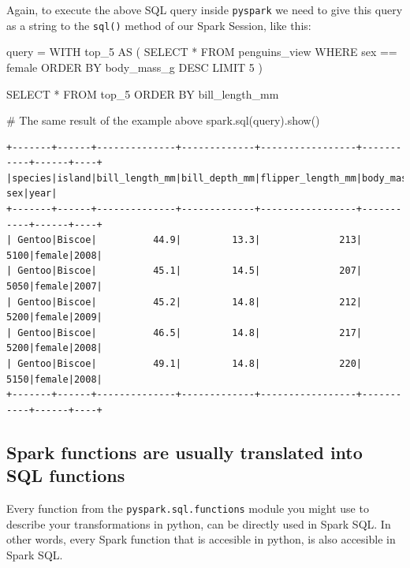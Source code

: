 \documentclass[
  11pt,
  letterpaper,
  DIV=11,
  numbers=noendperiod]{scrreprt}
\newenvironment{Shaded}{\begin{snugshade}}{\end{snugshade}}
\newcommand{\CommentTok}[1]{\textcolor[rgb]{0.37,0.37,0.37}{#1}}
\newcommand{\NormalTok}[1]{\textcolor[rgb]{0.00,0.23,0.31}{#1}}
\newcommand{\OperatorTok}[1]{\textcolor[rgb]{0.37,0.37,0.37}{#1}}
\newcommand{\StringTok}[1]{\textcolor[rgb]{0.13,0.47,0.30}{#1}}
\begin{document}
Again, to execute the above SQL query inside \texttt{pyspark} we need to
give this query as a string to the \texttt{sql()} method of our Spark
Session, like this:

\begin{Shaded}
\begin{Highlighting}[]
\NormalTok{query }\OperatorTok{=} \StringTok{\textquotesingle{}\textquotesingle{}\textquotesingle{}}
\StringTok{WITH top\_5 AS (}
\StringTok{    SELECT *}
\StringTok{    FROM penguins\_view}
\StringTok{    WHERE sex == \textquotesingle{}female\textquotesingle{}}
\StringTok{    ORDER BY body\_mass\_g DESC}
\StringTok{    LIMIT 5}
\StringTok{)}

\StringTok{SELECT *}
\StringTok{FROM top\_5}
\StringTok{ORDER BY bill\_length\_mm}
\StringTok{\textquotesingle{}\textquotesingle{}\textquotesingle{}}

\CommentTok{\# The same result of the example above}
\NormalTok{spark.sql(query).show()}
\end{Highlighting}
\end{Shaded}

\begin{verbatim}
+-------+------+--------------+-------------+-----------------+-----------+------+----+
|species|island|bill_length_mm|bill_depth_mm|flipper_length_mm|body_mass_g|   sex|year|
+-------+------+--------------+-------------+-----------------+-----------+------+----+
| Gentoo|Biscoe|          44.9|         13.3|              213|       5100|female|2008|
| Gentoo|Biscoe|          45.1|         14.5|              207|       5050|female|2007|
| Gentoo|Biscoe|          45.2|         14.8|              212|       5200|female|2009|
| Gentoo|Biscoe|          46.5|         14.8|              217|       5200|female|2008|
| Gentoo|Biscoe|          49.1|         14.8|              220|       5150|female|2008|
+-------+------+--------------+-------------+-----------------+-----------+------+----+
\end{verbatim}

\hypertarget{sec-sql-expr}{%
\subsection{Spark functions are usually translated into SQL
functions}\label{sec-sql-expr}}

Every function from the \texttt{pyspark.sql.functions} module you might
use to describe your transformations in python, can be directly used in
Spark SQL. In other words, every Spark function that is accesible in
python, is also accesible in Spark SQL.
\end{document}
